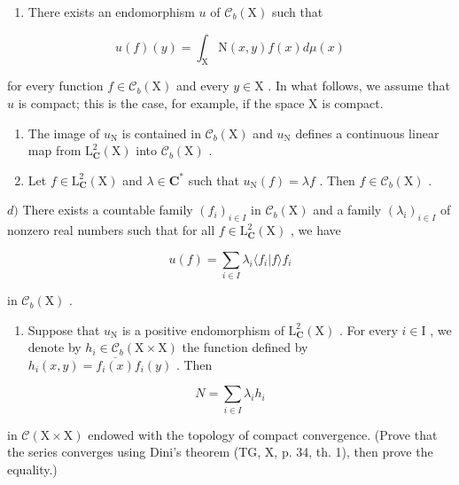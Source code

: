 \begin{enumerate}
\def\labelenumi{\alph{enumi})}
\tightlist
\item
  There exists an endomorphism \(u\) of \(\mathcal{C}_b(\mathrm{X})\) such that
\end{enumerate}

\[
u (f) (y) = \int_ {\mathrm{X}} \mathrm{N} (x, y) f (x) d \mu (x)
\]

for every function \(f \in \mathcal{C}_b(\mathrm{X})\) and every \(y \in \mathrm{X}\) . In what follows, we assume that \(u\) is compact; this is the case, for example, if the space \(\mathrm{X}\) is compact.

\begin{enumerate}
\def\labelenumi{\alph{enumi})}
\setcounter{enumi}{1}
\item
  The image of \(u_{\mathrm{N}}\) is contained in \(\mathcal{C}_b(\mathrm{X})\) and \(u_{\mathrm{N}}\) defines a continuous linear map from \(\mathrm{L}_{\mathbf{C}}^{2}(\mathrm{X})\) into \(\mathcal{C}_b(\mathrm{X})\) .
\item
  Let \(f \in \mathrm{L}_{\mathbf{C}}^{2}(\mathrm{X})\) and \(\lambda \in \mathbf{C}^*\) such that \(u_{\mathrm{N}}(f) = \lambda f\) . Then \(f \in \mathcal{C}_b(\mathrm{X})\) .
\end{enumerate}

\(d)\) There exists a countable family \((f_i)_{i\in I}\) in \(\mathcal{C}_b(\mathrm{X})\) and a family \((\lambda_i)_{i\in I}\) of nonzero real numbers such that for all \(f\in \mathrm{L}_{\mathbf{C}}^2 (\mathrm{X})\) , we have

\[
u (f) = \sum_ {i \in I} \lambda_ {i} \langle f _ {i} | f \rangle f _ {i}
\]

in \(\mathcal{C}_b(\mathrm{X})\) .

\begin{enumerate}
\def\labelenumi{\alph{enumi})}
\setcounter{enumi}{4}
\tightlist
\item
  Suppose that \(u_{\mathrm{N}}\) is a positive endomorphism of \(\mathrm{L}_{\mathbf{C}}^{2}(\mathrm{X})\) . For every \(i \in \mathrm{I}\) , we denote by \(h_i \in \mathcal{C}_b(\mathrm{X} \times \mathrm{X})\) the function defined by \(h_i(x,y) = \overline{f_i(x)} f_i(y)\) . Then
\end{enumerate}

\[
N = \sum_ {i \in I} \lambda_ {i} h _ {i}
\]

in \(\mathcal{C}(\mathrm{X}\times\mathrm{X})\) endowed with the topology of compact convergence. (Prove that the series converges using Dini's theorem (TG, X, p. 34, th. 1), then prove the equality.)

